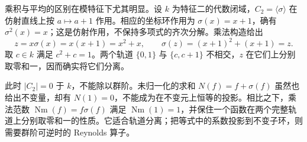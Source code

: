 \ProseParagraphBreak
乘积与平均的区别在模特征下尤其明显。设 \(k\) 为特征二的代数闭域，\(C_2=\langle\sigma\rangle\) 在仿射直线上按 \(a\mapsto a+1\) 作用。相应的坐标环作用为 \(\sigma(x)=x+1\)，确有 \(\sigma^2(x)=x\)；这是仿射作用，不保持多项式的齐次分解。乘法构造给出
\[
	z=x\sigma(x)=x(x+1)=x^2+x,\qquad \sigma(z)=(x+1)^2+(x+1)=z.
\]
取 \(c\in k\) 满足 \(c^2+c=1\)。两个轨道 \(\{0,1\}\) 与 \(\{c,c+1\}\) 不相交，\(z\) 在它们上分别取零和一，因而确实将它们分离。

\ProseParagraphBreak
此时 \(|C_2|=0\) 于 \(k\)，不能除以群阶。未归一化的求和 \(N(f)=f+\sigma(f)\) 虽然也给出不变量，却有 \(N(1)=0\)，不能成为在不变元上恒等的投影。相比之下，乘法范数 \(\operatorname{Nm}(f)=f\sigma(f)\) 满足 \(\operatorname{Nm}(1)=1\)，并保住一个函数在两个完整轨道上分别取零和一的性质。它适合轨道分离；把等式中的系数投影到不变子环，则需要群阶可逆时的 Reynolds 算子。
